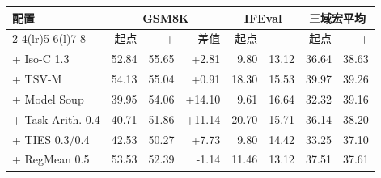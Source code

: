 \begin{tabular}{@{}lrrrrrrr@{}}
\toprule
\method{} 配置 & \multicolumn{3}{c}{GSM8K} & \multicolumn{2}{c}{IFEval} & \multicolumn{2}{c}{三域宏平均} \\
\cmidrule(lr){2-4}\cmidrule(lr){5-6}\cmidrule(l){7-8}
 & 起点 & + \method{} & 差值 & 起点 & + \method{} & 起点 & + \method{} \\
\midrule
\method{} + Iso-C 1.3 & 52.84 & 55.65 & +2.81 & 9.80 & 13.12 & 36.64 & 38.63 \\
\method{} + TSV-M & 54.13 & 55.04 & +0.91 & 18.30 & 15.53 & 39.97 & 39.26 \\
\method{} + Model Soup & 39.95 & 54.06 & +14.10 & 9.61 & 16.64 & 32.32 & 39.16 \\
\method{} + Task Arith. 0.4 & 40.71 & 51.86 & +11.14 & 20.70 & 15.71 & 36.14 & 38.20 \\
\method{} + TIES 0.3/0.4 & 42.53 & 50.27 & +7.73 & 9.80 & 14.42 & 33.25 & 37.10 \\
\method{} + RegMean 0.5 & 53.53 & 52.39 & -1.14 & 11.46 & 13.12 & 37.51 & 37.61 \\
\bottomrule
\end{tabular}
